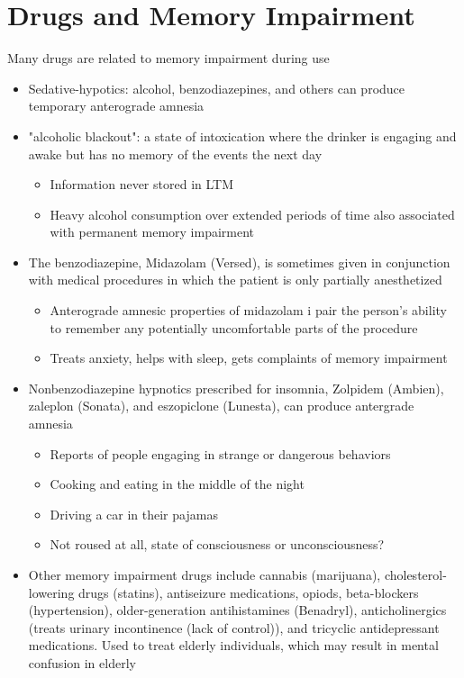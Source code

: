 \documentclass{article}
\begin{document}
\section{Drugs and Memory Impairment}
Many drugs are related to memory impairment during use
\begin{itemize}
    \item Sedative-hypotics: alcohol, benzodiazepines, and others can produce temporary anterograde amnesia
    \item "alcoholic blackout": a state of intoxication where the drinker is engaging and awake but has no memory of the events  the next day
    \begin{itemize}
        \item Information never stored in LTM
        \item Heavy alcohol consumption over extended periods of time also associated with permanent memory impairment
    \end{itemize}
    
    \item The benzodiazepine, Midazolam (Versed), is sometimes given in conjunction with medical procedures in which the patient is only partially anesthetized
    \begin{itemize}
        \item Anterograde amnesic properties of midazolam i pair the person's ability to remember any potentially uncomfortable parts of the procedure
        \item Treats anxiety, helps with sleep, gets complaints of memory impairment
    \end{itemize}
    \item Nonbenzodiazepine hypnotics prescribed for insomnia, Zolpidem (Ambien), zaleplon (Sonata), and eszopiclone (Lunesta), can produce antergrade amnesia
    \begin{itemize}
        \item Reports of people engaging in strange or dangerous behaviors
        \item Cooking and eating in the middle of the night
        \item Driving a car in their pajamas
        \item Not roused at all, state of consciousness or unconsciousness?
    \end{itemize}
    
    \item Other memory impairment drugs include cannabis (marijuana), cholesterol-lowering drugs (statins), antiseizure medications, opiods, beta-blockers (hypertension), older-generation antihistamines (Benadryl), anticholinergics (treats urinary incontinence (lack of control)), and tricyclic antidepressant medications. 
    \subitem Used to treat elderly individuals, which may result in mental confusion in elderly
\end{itemize}
\end{document}
